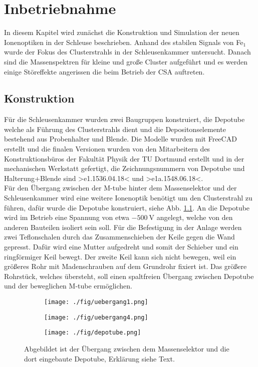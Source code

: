 \chapter{Inbetriebnahme}
\label{sec:inbetriebnahme}
In diesem Kapitel wird zunächst die Konstruktion und Simulation der neuen Ionenoptiken in der Schleuse beschrieben.
Anhand des stabilen Signals von Fe$_1$ wurde der Fokus des Clusterstrahls in der Schleusenkammer untersucht.
Danach sind die Massenspektren für kleine und große Cluster aufgeführt und es werden einige Störeffekte angerissen die beim Betrieb der CSA auftreten.
\section{Konstruktion}
Für die Schleusenkammer wurden zwei Baugruppen konstruiert, die Depotube welche als Führung des Clusterstrahls dient und die Depositonselemente bestehend aus Probenhalter und Blende. Die Modelle wurden mit FreeCAD\cite{freecad} erstellt und die finalen Versionen wurden von den Mitarbeitern des Konstruktionsbüros der Fakultät Physik der TU Dortmund erstellt \cite{konstruktion} und in der mechanischen Werkstatt gefertigt, die Zeichnungsnummern von Depotube und Halterung+Blende sind >e1.1536.04.18< und >e1a.1548.06.18<.\\

Für den Übergang zwischen der M-tube hinter dem Massenselektor und der Schleusenkammer wird eine weitere Ionenoptik benötigt um den Clusterstrahl zu führen, dafür wurde die Depotube konstruiert, siehe Abb. \ref{fig:depotube}.
An die Depotube wird im Betrieb eine Spannung von etwa $\SI{-500}{\volt}$ angelegt, welche von den anderen Bauteilen isoliert sein soll.
Für die Befestigung in der Anlage werden zwei Teflonschalen durch das Zusammenschieben der Keile gegen die Wand gepresst.
Dafür wird eine Mutter aufgedreht und somit der Schieber und ein ringförmiger Keil bewegt.
Der zweite Keil kann sich nicht bewegen, weil ein größeres Rohr mit Madenschrauben auf dem Grundrohr fixiert ist.
Das größere Rohrstück, welches übersteht, soll einen spaltfreien Übergang zwischen Depotube und der beweglichen M-tube ermöglichen.

\begin{figure}
  \begin{subfigure}[h]{1\textwidth}
    \texttt{[image: ./fig/uebergang1.png]}
  \end{subfigure}\hfill
  \begin{subfigure}[h]{1\textwidth}
    \texttt{[image: ./fig/uebergang4.png]}
  \end{subfigure}\hfill
  \begin{subfigure}[h]{1\textwidth}
    \texttt{[image: ./fig/depotube.png]}
  \end{subfigure}
  \caption{Abgebildet ist der Übergang zwischen dem Massenselektor und die dort eingebaute Depotube, Erklärung siehe Text.}
  \label{fig:depotube}
\end{figure}


